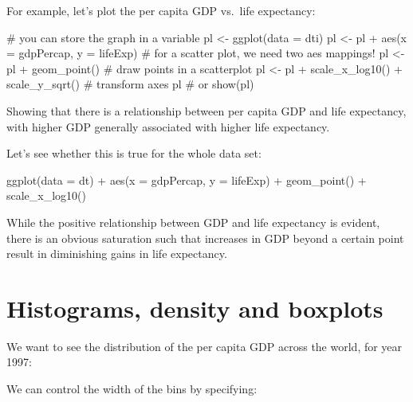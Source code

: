 \documentclass[
  letterpaper,
  DIV=11,
  numbers=noendperiod]{scrreprt}
\newenvironment{Shaded}{\begin{snugshade}}{\end{snugshade}}
\newcommand{\NormalTok}[1]{\textcolor[rgb]{0.00,0.23,0.31}{#1}}
\begin{document}
For example, let's plot the per capita GDP vs.~life expectancy:

\begin{Shaded}
\begin{Highlighting}[]
\NormalTok{\# you can store the graph in a variable}
\NormalTok{pl \textless{}{-} ggplot(data = dti)}
\NormalTok{pl \textless{}{-} pl + aes(x = gdpPercap, y = lifeExp) \# for a scatter plot, we need two aes mappings!}
\NormalTok{pl \textless{}{-} pl + geom\_point() \# draw points in a scatterplot}
\NormalTok{pl \textless{}{-} pl + scale\_x\_log10() + scale\_y\_sqrt() \# transform axes}
\NormalTok{pl \# or show(pl)}
\end{Highlighting}
\end{Shaded}

Showing that there is a relationship between per capita GDP and life
expectancy, with higher GDP generally associated with higher life
expectancy.

Let's see whether this is true for the whole data set:

\begin{Shaded}
\begin{Highlighting}[]
\NormalTok{ggplot(data = dt) + }
\NormalTok{    aes(x = gdpPercap, y = lifeExp) + }
\NormalTok{    geom\_point() + }
\NormalTok{    scale\_x\_log10()}
\end{Highlighting}
\end{Shaded}

While the positive relationship between GDP and life expectancy is
evident, there is an obvious saturation such that increases in GDP
beyond a certain point result in diminishing gains in life expectancy.

\section{Histograms, density and
boxplots}\label{histograms-density-and-boxplots}

We want to see the distribution of the per capita GDP across the world,
for year 1997:

\begin{Shaded}
\end{Shaded}

We can control the width of the bins by specifying:
\end{document}
